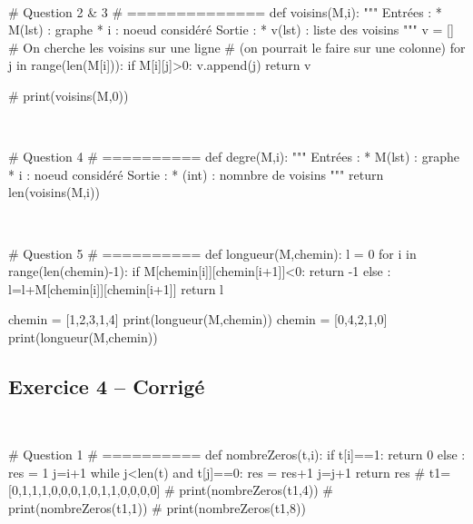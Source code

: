 \documentclass[10pt,fleqn]{article} %
\begin{document}
\begin{corrige}
$\quad$
\begin{python}
# Question 2 & 3
# ==============
def voisins(M,i):
    """
    Entrées : 
      * M(lst) : graphe
      * i : noeud considéré
    Sortie :
      * v(lst) : liste des voisins
    """
    v = []
    # On cherche les voisins sur une ligne 
    # (on pourrait le faire sur une colonne)
    for j in range(len(M[i])):
        if M[i][j]>0:
            v.append(j)
    return v
    
# print(voisins(M,0))
\end{python}
\end{corrige}


\begin{corrige}
$\quad$
\begin{python}
# Question 4
# ==========
def degre(M,i):
    """
    Entrées : 
      * M(lst) : graphe
      * i : noeud considéré
    Sortie :
      * (int) : nomnbre de voisins
    """
    return len(voisins(M,i))
\end{python}
\end{corrige}

\begin{corrige}
$\quad$
\begin{python}
# Question 5
# ==========
def longueur(M,chemin):
    l = 0
    for i in range(len(chemin)-1):
        if M[chemin[i]][chemin[i+1]]<0:
            return -1
        else :
            l=l+M[chemin[i]][chemin[i+1]]
    return l
    
chemin = [1,2,3,1,4]
print(longueur(M,chemin))        
chemin = [0,4,2,1,0]
print(longueur(M,chemin))
\end{python}
\end{corrige}

\vfill

\subsection*{Exercice 4 -- Corrigé}
\begin{corrige}
$\quad$
\begin{python}
# Question 1 
# ==========
def nombreZeros(t,i):
    if t[i]==1:
        return 0
    else : 
        res = 1
        j=i+1
        while j<len(t) and t[j]==0:
            res = res+1
            j=j+1
    return res
# t1=[0,1,1,1,0,0,0,1,0,1,1,0,0,0,0]
# print(nombreZeros(t1,4))
# print(nombreZeros(t1,1))
# print(nombreZeros(t1,8))
\end{python}
\end{corrige}
\end{document}
